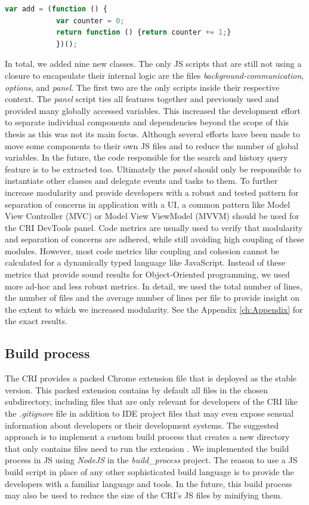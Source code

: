 		\begin{lstlisting}[language=JavaScript, caption={Example of RxJS code.},label={lst:closure}]
			var add = (function () {
			var counter = 0;
			return function () {return counter += 1;}
			})();
		\end{lstlisting}
In total, we added nine new classes. The only JS scripts that are still not using a closure to encapsulate their internal logic are the files \emph{background-communication}, \emph{options}, and \emph{panel}. The first two are the only scripts inside their respective context. The \emph{panel} script ties all features together and previously used and provided many globally accessed variables. This increased the development effort to separate individual components and dependencies beyond the scope of this thesis as this was not its main focus. Although several efforts have been made to move some components to their own JS files and to reduce the number of global variables. In the future, the code responsible for the search and history query feature is to be extracted too. Ultimately the \emph{panel} should only be responsible to instantiate other classes and delegate events and tasks to them. To further increase modularity and provide developers with a robust and tested pattern for separation of concerns in application with a UI, a common pattern like Model View Controller (MVC) or Model View ViewModel (MVVM) should be used for the CRI DevTools panel.
Code metrics are usually used to verify that modularity and separation of concerns are adhered, while still avoiding high coupling of these modules. However, most code metrics like coupling and cohesion \cite{Coupling} cannot be calculated for a dynamically typed language like JavaScript. Instead of these metrics that provide sound results for Object-Oriented programming, we used more ad-hoc and less robust metrics. In detail, we used the total number of lines, the number of files and the average number of lines per file to provide insight on the extent to which we increased modularity. See the Appendix \ref{ch:Appendix} for the exact results.
	
\subsection{Build process}
The CRI provides a packed Chrome extension file that is deployed as the stable version. This packed extension contains by default all files in the chosen subdirectory, including files that are only relevant for developers of the CRI like the \emph{.gitignore} file in addition to IDE project files that may even expose sensual information about developers or their development systems. The suggested approach is to implement a custom build process that creates a new directory that only contains files need to run the extension \cite{BuildScript}. We implemented the build process in JS using \emph{NodeJS} \cite{NodeJS} in the \emph{build\_process} project. The reason to use a JS build script in place of any other sophisticated build language is to provide the developers with a familiar language and tools. In the future, this build process may also be used to reduce the size of the CRI's JS files by minifying them. 